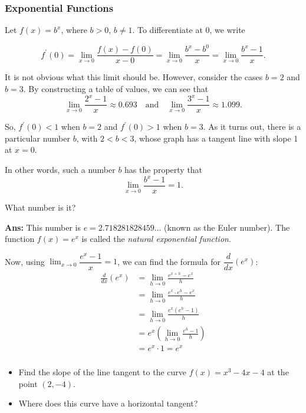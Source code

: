 \documentclass[14pt]{beamer}
\begin{document}
\begin{frame}
\frametitle{Exponential Functions}
\small
Let $f(x)=b^x$, where $b>0$, $b \neq 1$.  To differentiate at $0$, we write

\vspace{-2pc}
\[f^{\prime}(0)=\lim_{x \to 0}\dfrac{f(x)-f(0)}{x-0}=\lim_{x \to 0} \dfrac{b^x-b^0}{x}=
\lim_{x \to 0} \dfrac{b^x-1}{x}.\]

\vspace{1pc}
It is not obvious what this limit should be.  However, consider the cases $b=2$ and $b=3$.  By constructing a table of values, we can see that 
\[\lim_{x \to 0} \frac{2^x-1}{x} \approx 0.693 \quad \text{and}\quad \lim_{x \to 0} \frac{3^x-1}{x} \approx 1.099.\]
\end{frame}

\begin{frame}
\small
So, $f^{\prime}(0)<1$ when $b=2$ and $f^{\prime}(0)>1$ when $b=3$.  As it turns out, there is a particular number $b$, with $2<b<3$, whose graph has a tangent line with slope 1 at $x=0$.  

In other words, such a number $b$ has the property that 
\[\lim_{x \to 0} \dfrac{b^x-1}{x}=1.\]
\begin{que}What number is it? \end{que}
{\bf Ans:} This number is $e=2.718281828459 \dots$ (known as the Euler number).  The function $f(x)=e^x$ is called the \emph{\alert{natural exponential function}}.

\end{frame}

\begin{frame}
\footnotesize
Now, using  $\displaystyle\lim_{x \to 0} \dfrac{e^x-1}{x}=1$, we can find the formula for $\dfrac{d}{dx}(e^x)$:
\begin{align*}
\frac{d}{dx}(e^x) &= \lim_{h \to 0} \frac{e^{x+h}-e^x}{h} \\[0.25pc]
 &= \lim_{h \to 0}\frac{e^x \cdot e^h -e^x}{h} \\[0.25pc]
 &= \lim_{h\to 0}\frac{e^x(e^h-1)}{h} \\[0.25pc]
 &=e^x \left(\lim_{h \to 0} \frac{e^h-1}{h}\right) \\[0.25pc]
  &= e^x \cdot 1 = e^x
\end{align*}
\end{frame}

\begin{frame}
\frametitle{}
\begin{exe} 
	\begin{itemize}
	\item Find the slope of the line tangent to the curve $f(x)=x^3-4x-4$ at the point $(2,-4)$. 
	\item Where does this curve have a horizontal tangent?
	\end{itemize}
\end{exe}	
\end{frame}
\end{document}
